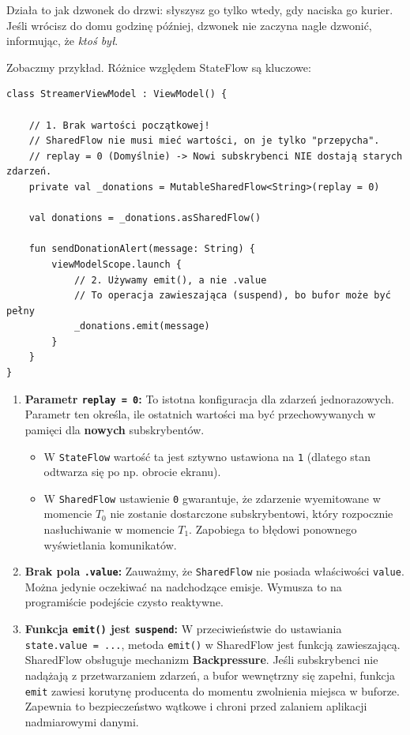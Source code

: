 Działa to jak dzwonek do drzwi: słyszysz go tylko wtedy, gdy naciska go kurier. Jeśli wrócisz do domu godzinę później, dzwonek nie zaczyna nagle dzwonić, informując, że \textit{ktoś był}.

Zobaczmy przykład. Różnice względem StateFlow są kluczowe:

\begin{verbatim}
class StreamerViewModel : ViewModel() {

    // 1. Brak wartości początkowej!
    // SharedFlow nie musi mieć wartości, on je tylko "przepycha".
    // replay = 0 (Domyślnie) -> Nowi subskrybenci NIE dostają starych zdarzeń.
    private val _donations = MutableSharedFlow<String>(replay = 0)
    
    val donations = _donations.asSharedFlow()

    fun sendDonationAlert(message: String) {
        viewModelScope.launch {
            // 2. Używamy emit(), a nie .value
            // To operacja zawieszająca (suspend), bo bufor może być pełny
            _donations.emit(message)
        }
    }
}
\end{verbatim}

\begin{enumerate}
    \item \textbf{Parametr \texttt{replay = 0}:} 
    To istotna konfiguracja dla zdarzeń jednorazowych. Parametr ten określa, ile ostatnich wartości ma być przechowywanych w pamięci dla \textbf{nowych} subskrybentów.
    \begin{itemize}
        \item W \texttt{StateFlow} wartość ta jest sztywno ustawiona na \texttt{1} (dlatego stan odtwarza się po np. obrocie ekranu).
        \item W \texttt{SharedFlow} ustawienie \texttt{0} gwarantuje, że zdarzenie wyemitowane w momencie $T_0$ nie zostanie dostarczone subskrybentowi, który rozpocznie nasłuchiwanie w momencie $T_1$. Zapobiega to błędowi ponownego wyświetlania komunikatów.
    \end{itemize}

    \item \textbf{Brak pola \texttt{.value}:}
    Zauważmy, że \texttt{SharedFlow} nie posiada właściwości \texttt{value}. Można jedynie oczekiwać na nadchodzące emisje. Wymusza to na programiście podejście czysto reaktywne.

    \item \textbf{Funkcja \texttt{emit()} jest \texttt{suspend}:}
    W przeciwieństwie do ustawiania \texttt{state.value = ...}, metoda \texttt{emit()} w SharedFlow jest funkcją zawieszającą. 
    SharedFlow obsługuje mechanizm \textbf{Backpressure}. Jeśli subskrybenci nie nadążają z przetwarzaniem zdarzeń, a bufor wewnętrzny się zapełni, funkcja \texttt{emit} zawiesi korutynę producenta do momentu zwolnienia miejsca w buforze. Zapewnia to bezpieczeństwo wątkowe i chroni przed zalaniem aplikacji nadmiarowymi danymi.
\end{enumerate}

